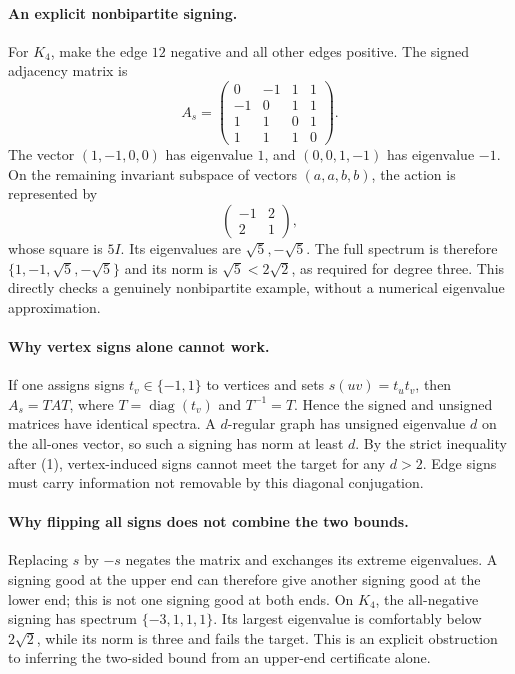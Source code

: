 \documentclass[11pt,a4paper]{article}
\begin{document}
\paragraph{An explicit nonbipartite signing.}
For $K_4$, make the edge $12$ negative and all other edges positive. The signed adjacency matrix is
\[
 A_s=\begin{pmatrix}
 0&-1&1&1\\-1&0&1&1\\1&1&0&1\\1&1&1&0
 \end{pmatrix}.
\]
The vector $(1,-1,0,0)$ has eigenvalue $1$, and $(0,0,1,-1)$ has eigenvalue $-1$. On the remaining invariant subspace of vectors $(a,a,b,b)$, the action is represented by
\[
 \begin{pmatrix}-1&2\\2&1\end{pmatrix},
\]
whose square is $5I$. Its eigenvalues are $\sqrt5,-\sqrt5$. The full spectrum is therefore $\{1,-1,\sqrt5,-\sqrt5\}$ and its norm is $\sqrt5<2\sqrt2$, as required for degree three. This directly checks a genuinely nonbipartite example, without a numerical eigenvalue approximation.

\paragraph{Why vertex signs alone cannot work.}
If one assigns signs $t_v\in\{-1,1\}$ to vertices and sets $s(uv)=t_ut_v$, then $A_s=TAT$, where $T=\operatorname{diag}(t_v)$ and $T^{-1}=T$. Hence the signed and unsigned matrices have identical spectra. A $d$-regular graph has unsigned eigenvalue $d$ on the all-ones vector, so such a signing has norm at least $d$. By the strict inequality after (1), vertex-induced signs cannot meet the target for any $d>2$. Edge signs must carry information not removable by this diagonal conjugation.

\paragraph{Why flipping all signs does not combine the two bounds.}
Replacing $s$ by $-s$ negates the matrix and exchanges its extreme eigenvalues. A signing good at the upper end can therefore give another signing good at the lower end; this is not one signing good at both ends. On $K_4$, the all-negative signing has spectrum $\{-3,1,1,1\}$. Its largest eigenvalue is comfortably below $2\sqrt2$, while its norm is three and fails the target. This is an explicit obstruction to inferring the two-sided bound from an upper-end certificate alone.
\end{document}
